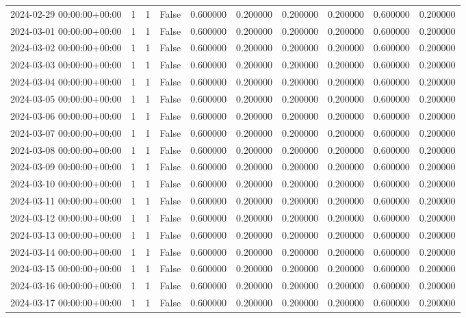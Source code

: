 \begin{tabular}{lrrrrrrrrr}
2024-02-29 00:00:00+00:00 & 1 & 1 & False & 0.600000 & 0.200000 & 0.200000 & 0.200000 & 0.600000 & 0.200000 \\
2024-03-01 00:00:00+00:00 & 1 & 1 & False & 0.600000 & 0.200000 & 0.200000 & 0.200000 & 0.600000 & 0.200000 \\
2024-03-02 00:00:00+00:00 & 1 & 1 & False & 0.600000 & 0.200000 & 0.200000 & 0.200000 & 0.600000 & 0.200000 \\
2024-03-03 00:00:00+00:00 & 1 & 1 & False & 0.600000 & 0.200000 & 0.200000 & 0.200000 & 0.600000 & 0.200000 \\
2024-03-04 00:00:00+00:00 & 1 & 1 & False & 0.600000 & 0.200000 & 0.200000 & 0.200000 & 0.600000 & 0.200000 \\
2024-03-05 00:00:00+00:00 & 1 & 1 & False & 0.600000 & 0.200000 & 0.200000 & 0.200000 & 0.600000 & 0.200000 \\
2024-03-06 00:00:00+00:00 & 1 & 1 & False & 0.600000 & 0.200000 & 0.200000 & 0.200000 & 0.600000 & 0.200000 \\
2024-03-07 00:00:00+00:00 & 1 & 1 & False & 0.600000 & 0.200000 & 0.200000 & 0.200000 & 0.600000 & 0.200000 \\
2024-03-08 00:00:00+00:00 & 1 & 1 & False & 0.600000 & 0.200000 & 0.200000 & 0.200000 & 0.600000 & 0.200000 \\
2024-03-09 00:00:00+00:00 & 1 & 1 & False & 0.600000 & 0.200000 & 0.200000 & 0.200000 & 0.600000 & 0.200000 \\
2024-03-10 00:00:00+00:00 & 1 & 1 & False & 0.600000 & 0.200000 & 0.200000 & 0.200000 & 0.600000 & 0.200000 \\
2024-03-11 00:00:00+00:00 & 1 & 1 & False & 0.600000 & 0.200000 & 0.200000 & 0.200000 & 0.600000 & 0.200000 \\
2024-03-12 00:00:00+00:00 & 1 & 1 & False & 0.600000 & 0.200000 & 0.200000 & 0.200000 & 0.600000 & 0.200000 \\
2024-03-13 00:00:00+00:00 & 1 & 1 & False & 0.600000 & 0.200000 & 0.200000 & 0.200000 & 0.600000 & 0.200000 \\
2024-03-14 00:00:00+00:00 & 1 & 1 & False & 0.600000 & 0.200000 & 0.200000 & 0.200000 & 0.600000 & 0.200000 \\
2024-03-15 00:00:00+00:00 & 1 & 1 & False & 0.600000 & 0.200000 & 0.200000 & 0.200000 & 0.600000 & 0.200000 \\
2024-03-16 00:00:00+00:00 & 1 & 1 & False & 0.600000 & 0.200000 & 0.200000 & 0.200000 & 0.600000 & 0.200000 \\
2024-03-17 00:00:00+00:00 & 1 & 1 & False & 0.600000 & 0.200000 & 0.200000 & 0.200000 & 0.600000 & 0.200000 \\

\end{tabular}
